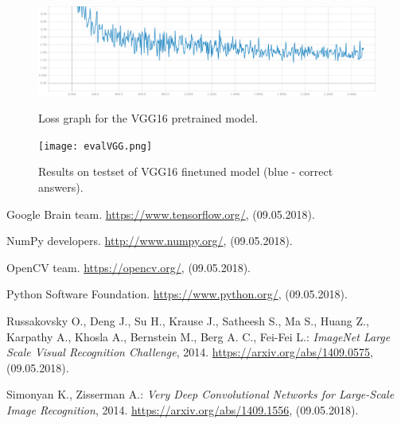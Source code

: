 \documentclass[a4paper]{article}
\begin{document}
\begin{figure}[h]
    \caption[]{Loss graph for the VGG16 pretrained model.}
    \centering
    \includegraphics[page=2,width=1.0\textwidth]{vggTraining_loss.png}
    \label{fig:trainingVGG_loss}
\end{figure}

\begin{figure}[h]
    \caption[]{Results on testset of VGG16 finetuned model (blue - correct answers).}
    \centering
    \texttt{[image: evalVGG.png]}
    \label{fig:evalVGG}
\end{figure}



\clearpage
\begin{thebibliography}{99}

 Google Brain team. \url{https://www.tensorflow.org/}, (09.05.2018).

 NumPy developers. \url{http://www.numpy.org/}, (09.05.2018).

 OpenCV team. \url{https://opencv.org/}, (09.05.2018).

 Python Software Foundation. \url{https://www.python.org/}, (09.05.2018).

Russakovsky O., Deng J., Su H., Krause J., Satheesh S., Ma S., Huang Z., Karpathy A., Khosla A., Bernstein M., Berg A. C., Fei-Fei L.: \textit{ImageNet Large Scale Visual Recognition Challenge}, 2014. 
\url{https://arxiv.org/abs/1409.0575}, (09.05.2018).

Simonyan K., Zisserman A.: \textit{Very Deep Convolutional Networks for Large-Scale Image Recognition}, 2014. \url{https://arxiv.org/abs/1409.1556}, (09.05.2018).

\end{thebibliography}
\end{document}
